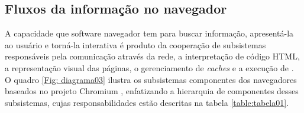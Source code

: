 \subsection{Fluxos da informação no navegador}

A capacidade que software navegador tem para buscar informação, apresentá-la ao usuário e torná-la interativa é produto da cooperação de subsistemas responsáveis pela comunicação através da rede, a interpretação de código HTML, a representação visual das páginas, o gerenciamento de \textit{caches} e a execução de \scripts{}. O quadro \ref{Fig: diagrama03} ilustra os subsistemas componentes dos navegadores baseados no projeto Chromium \cite{Chromium2018_MPA, Chromium2018_MPRL, HTML5Rocks2011}, enfatizando a hierarquia de componentes desses subsistemas, cujas responsabilidades estão descritas na tabela \ref{table:tabela01}.

